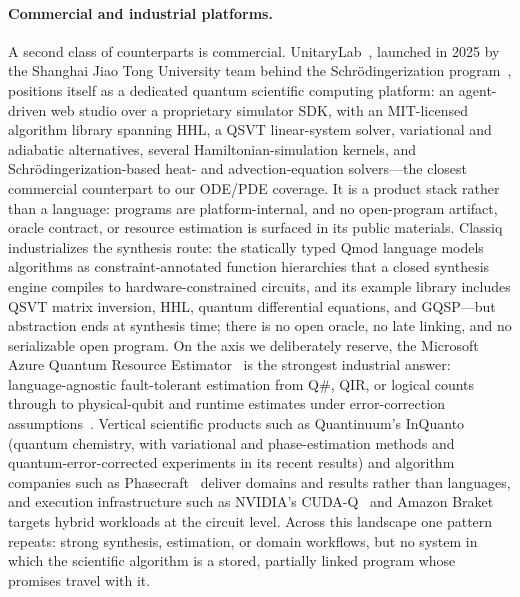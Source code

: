 \paragraph{Commercial and industrial platforms.}
A second class of counterparts is commercial.
UnitaryLab~\cite{unitarylab2025platform}, launched in 2025 by the
Shanghai Jiao Tong University team behind the Schr\"odingerization
program~\cite{jin2024schrodingerization,hu2024schrocircuits}, positions
itself as a dedicated quantum scientific computing platform: an
agent-driven web studio over a proprietary simulator SDK, with an
MIT-licensed algorithm library spanning HHL, a QSVT linear-system solver,
variational and adiabatic alternatives, several Hamiltonian-simulation
kernels, and Schr\"odingerization-based heat- and advection-equation
solvers---the closest commercial counterpart to our ODE/PDE coverage.  It
is a product stack rather than a language: programs are
platform-internal, and no open-program artifact, oracle contract, or
resource estimation is surfaced in its public materials.
Classiq~\cite{classiq2026platform} industrializes the synthesis route: the
statically typed Qmod language models algorithms as constraint-annotated
function hierarchies that a closed synthesis engine compiles to
hardware-constrained circuits, and its example library includes QSVT
matrix inversion, HHL, quantum differential equations, and GQSP---but
abstraction ends at synthesis time; there is no open oracle, no late
linking, and no serializable open program.  On the axis we deliberately
reserve, the Microsoft Azure Quantum Resource
Estimator~\cite{microsoft2026azureqe} is the strongest industrial answer:
language-agnostic fault-tolerant estimation from Q\#, QIR, or logical
counts through to physical-qubit and runtime estimates under
error-correction
assumptions~\cite{beverland2022assessing}.  Vertical scientific products
such as Quantinuum's InQuanto~\cite{quantinuum2026inquanto} (quantum
chemistry, with variational and phase-estimation methods and
quantum-error-corrected experiments in its recent results) and algorithm
companies such as
Phasecraft~\cite{phasecraft2026} deliver domains and results rather than
languages, and execution infrastructure such as NVIDIA's
CUDA-Q~\cite{nvidia2026cudaq} and Amazon
Braket~\cite{amazonbraket2026sdk} targets hybrid workloads at the circuit
level.  Across this landscape one pattern repeats: strong synthesis,
estimation, or domain workflows, but no system in which the scientific
algorithm is a stored, partially linked program whose promises travel
with it.

